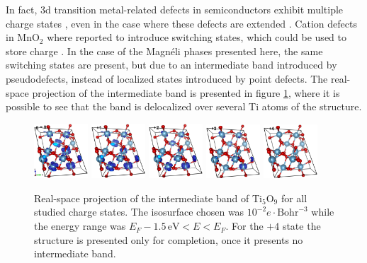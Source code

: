 In fact, 3d transition metal-related defects in semiconductors exhibit multiple charge states \cite{Haldane1976}, even in the case where these defects are extended \cite{Raebiger2014}. Cation defects in MnO$_2$ where reported to introduce switching states, which could be used to store charge \cite{Young2015}. In the case of the Magnéli phases presented here, the same switching states are present, but due to an intermediate band introduced by pseudodefects, instead of localized states introduced by point defects. The real-space projection of the intermediate band is presented in figure \ref{fig:ti5o9-parchg-prl}, where it is possible to see that the band is delocalized over several Ti atoms of the structure.
\begin{center}
 \begin{figure}[ht!]
  \begin{center}
   \includegraphics[width=0.18\textwidth]{img/ti5o9-q0-parchg-prl.jpg}
   \includegraphics[width=0.18\textwidth]{img/ti5o9-q1-parchg-prl.jpg}
   \includegraphics[width=0.18\textwidth]{img/ti5o9-q2-parchg-prl.jpg}
   \includegraphics[width=0.18\textwidth]{img/ti5o9-q3-parchg-prl.jpg}
   \includegraphics[width=0.18\textwidth]{img/ti5o9-q4-parchg-prl.jpg}
   \caption{Real-space projection of the intermediate band of Ti$_5$O$_9$ for all studied charge states. The isosurface chosen was $10^{-2}e\cdot \text{Bohr}^{-3}$ while the energy range was $E_F - 1.5 \, \text{eV} < E < E_F$. For the $+4$ state the structure is presented only for completion, once it presents no intermediate band.}
   \label{fig:ti5o9-parchg-prl} 
  \end{center}
 \end{figure}
\end{center}

